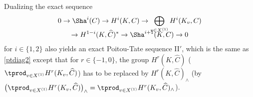 \begin{rema} \label{II'}
Dualizing the exact sequence
\begin{multline*}
0 \to \Sha^i(C) \to H^i(K,C) \to
\bigoplus_{v \in X^{(1)}} H^i(K_v,C)\\[-8pt]
\to H^{1-i}(K,\widehat C)^*
\to \Sha^{i+1}(K,C) \to 0
\end{multline*}
for $i \in \{1, 2\}$ also yields an exact Poitou-Tate sequence II$'$, which
is the same as \eqref{ptdiag2} except that for $r \in \{-1, 0\}$, the
group $H^r(K,\widehat C)$ (\resp $\tprod_{v \in X^{(1)}} H^r(K_v,\widehat C)$)
has to be replaced
by $H^r(K,\widehat C)_{\wedge}$ (\resp by $\bigl(\tprod_{v \in X^{(1)}} H^r(K_v,\widehat C)\bigr)_{\wedge}=
\tprod_{v \in X^{(1)}} H^r(K_v,\widehat C)_{\wedge}$).
\end{rema}

